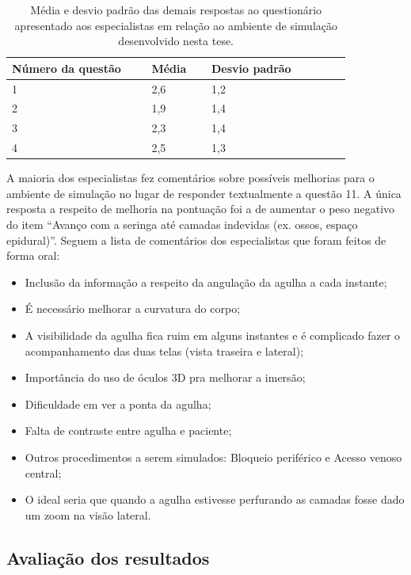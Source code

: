 \begin{table}[!ht]
\begin{center}
\caption{Média e desvio padrão das demais respostas ao questionário apresentado aos especialistas em relação ao ambiente de simulação desenvolvido nesta tese.}
\label{tab:demaisRespotasQuestionarioEspecialistas}
\begin{tabular}{|p{0.35\linewidth}|p{0.15\linewidth}|p{0.35\linewidth}|}
\hline
\textbf{Número da questão} & \textbf{Média} & \textbf{Desvio padrão}\\
\hline\hline
1 & 2,6 & 1,2\\
2 & 1,9 & 1,4\\
3 & 2,3 & 1,4\\
4 & 2,5 & 1,3\\
\hline
\end{tabular}
\end{center}
\end{table} 

A maioria dos especialistas fez comentários sobre possíveis melhorias para o ambiente de simulação no lugar de responder textualmente a questão 11. A única resposta a respeito de melhoria na pontuação foi a de aumentar o peso negativo do item ``Avanço com a seringa até camadas indevidas (ex. ossos, espaço epidural)''. Seguem a lista de comentários dos especialistas que foram feitos de forma oral: 
\begin{itemize}
   \item Inclusão da informação a respeito da angulação da agulha a cada instante;
   \item É necessário melhorar a curvatura do corpo;
   \item A visibilidade da agulha fica ruim em alguns instantes e é complicado fazer o acompanhamento das duas telas (vista traseira e lateral);
   \item Importância do uso de óculos 3D pra melhorar a imersão;
   \item Dificuldade em ver a ponta da agulha;
   \item Falta de contraste entre agulha e paciente;
   \item Outros procedimentos a serem simulados: Bloqueio periférico e Acesso venoso central;
   \item O ideal seria que quando a agulha estivesse perfurando as camadas fosse dado um zoom na visão lateral.
 \end{itemize}

\subsection{Avaliação dos resultados}
\label{sec:avaliacaoEspecialistas}

